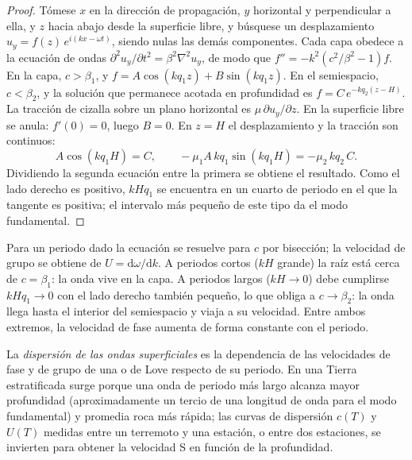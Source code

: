 \begin{proof}
Tómese $x$ en la dirección de propagación, $y$ horizontal y perpendicular a ella, y $z$ hacia abajo desde
la superficie libre, y búsquese un desplazamiento
$u_y = f(z)\,e^{i(kx - \omega t)}$, siendo nulas las demás componentes. Cada capa
obedece a la ecuación de ondas $\partial^2 u_y/\partial t^2 = \beta^2\nabla^2 u_y$, de modo que
$f'' = -k^2\left(c^2/\beta^2 - 1\right) f$. En la capa, $c > \beta_1$, y
$f = A\cos(kq_1z) + B\sin(kq_1z)$. En el semiespacio, $c < \beta_2$, y la
solución que permanece acotada en profundidad es $f = C\,e^{-kq_2(z - H)}$.
La tracción de cizalla sobre un plano horizontal es $\mu\,\partial u_y/\partial z$.
En la superficie libre se anula: $f'(0) = 0$, luego $B = 0$. En $z = H$ el
desplazamiento y la tracción son continuos:
\[
  A\cos(kq_1H) = C, \qquad -\mu_1 A\,kq_1\sin(kq_1H) = -\mu_2\,kq_2\,C .
\]
Dividiendo la segunda ecuación entre la primera se obtiene el resultado. Como el
lado derecho es positivo, $kHq_1$ se encuentra en un cuarto de periodo en el que la
tangente es positiva; el intervalo más pequeño de este tipo da el modo fundamental.
\end{proof}

Para un periodo dado la ecuación se resuelve para $c$ por bisección; la velocidad de grupo
se obtiene de $U = \mathrm d\omega/\mathrm dk$. A periodos cortos
($kH$ grande) la raíz está cerca de $c = \beta_1$: la onda vive en la capa. A
periodos largos ($kH \to 0$) debe cumplirse $kHq_1 \to 0$ con el lado derecho
también pequeño, lo que obliga a $c \to \beta_2$: la onda llega hasta el interior del
semiespacio y viaja a su velocidad. Entre ambos extremos, la velocidad de fase
aumenta de forma constante con el periodo.

\begin{definition}\label{def:b3:seismology-imaging:dispersion}
La \emph{dispersión de las ondas superficiales} es la dependencia
de las velocidades de fase y de grupo de una  o de Love respecto de su periodo. En
una Tierra estratificada surge porque una onda de periodo más largo alcanza mayor profundidad
(aproximadamente un tercio de una longitud de onda para el modo fundamental) y promedia
roca más rápida; las curvas de dispersión $c(T)$ y $U(T)$ medidas entre un terremoto
y una estación, o entre dos estaciones, se invierten para obtener la velocidad S en
función de la profundidad.
\end{definition}

